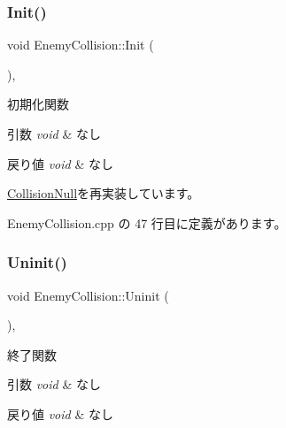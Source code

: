 \subsubsection{\texorpdfstring{Init()}{Init()}}
{\footnotesize\ttfamily void Enemy\+Collision\+::\+Init (\begin{DoxyParamCaption}{ }\end{DoxyParamCaption})\hspace{0.3cm}{\ttfamily [override]}, {\ttfamily [virtual]}}



初期化関数 


\begin{DoxyParams}{引数}
{\em void} & なし \\
\hline
\end{DoxyParams}

\begin{DoxyRetVals}{戻り値}
{\em void} & なし \\
\hline
\end{DoxyRetVals}


\mbox{\hyperlink{class_collision_null_af5db1d080c1c0c5a1199062850d8a2ff}{Collision\+Null}}を再実装しています。



 Enemy\+Collision.\+cpp の 47 行目に定義があります。

\mbox{\label{class_enemy_collision_a2a194c606fd162db803c70c6fed9b9e4}} 
\subsubsection{\texorpdfstring{Uninit()}{Uninit()}}
{\footnotesize\ttfamily void Enemy\+Collision\+::\+Uninit (\begin{DoxyParamCaption}{ }\end{DoxyParamCaption})\hspace{0.3cm}{\ttfamily [override]}, {\ttfamily [virtual]}}



終了関数 


\begin{DoxyParams}{引数}
{\em void} & なし \\
\hline
\end{DoxyParams}

\begin{DoxyRetVals}{戻り値}
{\em void} & なし \\
\hline
\end{DoxyRetVals}


